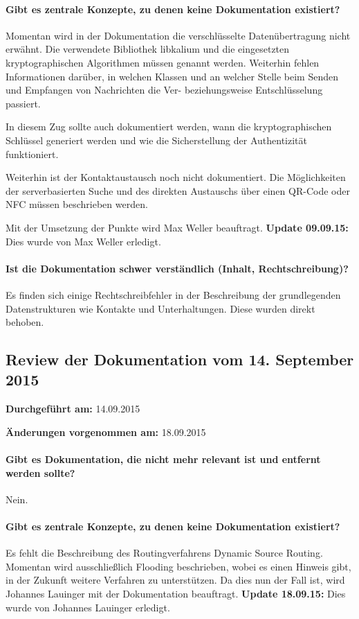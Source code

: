 \paragraph{Gibt es zentrale Konzepte, zu denen keine Dokumentation existiert?}
Momentan wird in der Dokumentation die verschlüsselte Datenübertragung nicht erwähnt. Die verwendete Bibliothek libkalium und die eingesetzten kryptographischen Algorithmen müssen genannt werden. Weiterhin fehlen Informationen darüber, in welchen Klassen und an welcher Stelle beim Senden und Empfangen von Nachrichten die Ver- beziehungsweise Entschlüsselung passiert.

In diesem Zug sollte auch dokumentiert werden, wann die kryptographischen Schlüssel generiert werden und wie die Sicherstellung der Authentizität funktioniert.

Weiterhin ist der Kontaktaustausch noch nicht dokumentiert. Die Möglichkeiten der serverbasierten Suche und des direkten Austauschs über einen QR-Code oder NFC müssen beschrieben werden.

Mit der Umsetzung der Punkte wird Max Weller beauftragt. \textbf{Update 09.09.15:} Dies wurde von Max Weller erledigt.

\paragraph{Ist die Dokumentation schwer verständlich (Inhalt, Rechtschreibung)?}
Es finden sich einige Rechtschreibfehler in der Beschreibung der grundlegenden Datenstrukturen wie Kontakte und Unterhaltungen. Diese wurden direkt behoben.


\subsection{Review der Dokumentation vom 14. September 2015}

\textbf{Durchgeführt am:} 14.09.2015

\textbf{Änderungen vorgenommen am:} 18.09.2015

\paragraph{Gibt es Dokumentation, die nicht mehr relevant ist und entfernt werden sollte?}
Nein.

\paragraph{Gibt es zentrale Konzepte, zu denen keine Dokumentation existiert?}
Es fehlt die Beschreibung des Routingverfahrens Dynamic Source Routing. Momentan wird ausschließlich Flooding beschrieben, wobei es einen Hinweis gibt, in der Zukunft weitere Verfahren zu unterstützen. Da dies nun der Fall ist, wird Johannes Lauinger mit der Dokumentation beauftragt. \textbf{Update 18.09.15:} Dies wurde von Johannes Lauinger erledigt.

